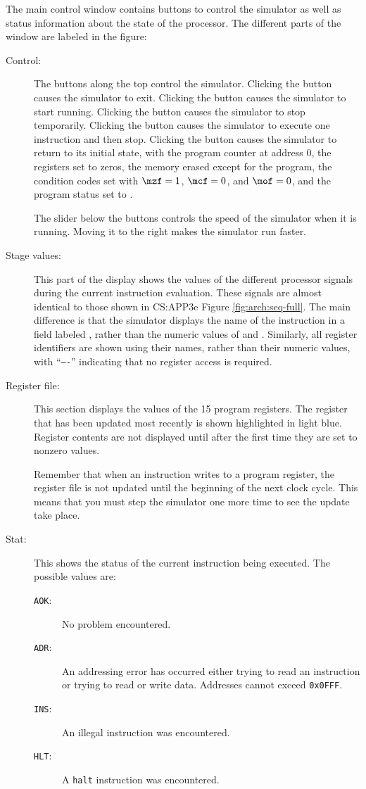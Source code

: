 \documentclass[11pt]{article}
\begin{document}
The main control window contains buttons to control the simulator as
well as status information about the state of the processor.  The
different parts of the window are labeled in the figure:

\begin{description}
\item[Control:] The buttons along the top control the simulator.
Clicking the  button causes the simulator to exit.
Clicking the  button causes the simulator to start running.
Clicking the  button causes the simulator to stop
temporarily.  Clicking the  button causes the simulator to
execute one instruction and then stop.  Clicking the 
button causes the simulator to return to its initial state, with the
program counter at address 0, the registers set to zeros, the memory
erased except for the program, the condition codes set with
$\mzf = 1$, $\mcf = 0$, and $\mof = 0$, and the program status set to
\verb@AOK@.

The slider below the buttons controls the speed of the simulator when
it is running.  Moving it to the right makes the simulator run faster.

\item[Stage values:] 
This part of the display shows the values of the
different processor signals during the current instruction evaluation.
These signals are almost identical to those shown in CS:APP3e Figure
\ref{fig:arch:seq-full}.  The main difference is that the simulator
displays the name of the instruction in a field labeled ,
rather than the numeric values of  and .
Similarly, all register identifiers are shown using their names,
rather  than their numeric values, with
``\texttt{----}'' indicating that no register access is required.
\item[Register file:] This section displays the values of the 15
program registers.  The register that has been updated most recently
is shown highlighted in light blue.  Register contents are not displayed
until after the first time they are set to nonzero values.

Remember that when an instruction writes to a program register, the
register file is not updated until the beginning of the next clock
cycle.  This means that you must step the simulator one more time to
see the update take place.

\item[Stat:] This shows the status of the current instruction being
executed.  The possible values are:
\begin{description}
\item[\texttt{AOK}:] No problem encountered.
\item[\texttt{ADR}:] An addressing error has occurred either trying to read an
instruction or trying to read or write data.  Addresses cannot exceed
\texttt{0x0FFF}.
\item[\texttt{INS}:] An illegal instruction was encountered.
\item[\texttt{HLT}:] A \texttt{halt} instruction was encountered.
\end{description}


\end{description}
\end{document}
